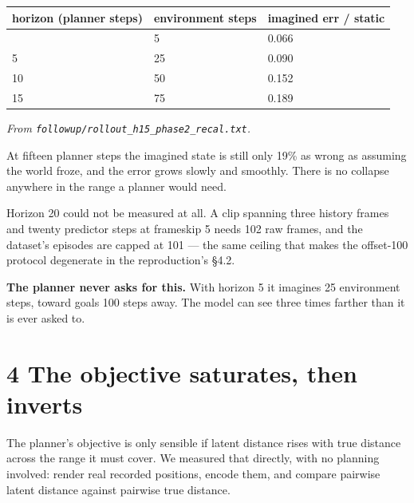 \documentclass[10pt]{article}
\newcounter{none}
\begin{document}
{\def\LTcaptype{none} %
\begin{longtable}[]{@{}lll@{}}
\toprule\noalign{}
horizon (planner steps) & environment steps & imagined err / static \\
\midrule\noalign{}
\endhead
\bottomrule\noalign{}
\endlastfoot
1 & 5 & 0.066 \\
5 & 25 & 0.090 \\
10 & 50 & 0.152 \\
15 & 75 & 0.189 \\
\end{longtable}
}

\emph{From \texttt{followup/rollout\_h15\_phase2\_recal.txt}.}

At fifteen planner steps the imagined state is still only 19\% as wrong as
assuming the world froze, and the error grows slowly and smoothly. There is no
collapse anywhere in the range a planner would need.

Horizon 20 could not be measured at all. A clip spanning three history frames
and twenty predictor steps at frameskip 5 needs 102 raw frames, and the
dataset's episodes are capped at 101 --- the same ceiling that makes the
offset-100 protocol degenerate in the reproduction's \S{}4.2.

\textbf{The planner never asks for this.} With horizon 5 it imagines 25
environment steps, toward goals 100 steps away. The model can see three times
farther than it is ever asked to.

\section{4 The objective saturates, then inverts}\label{the-objective-saturates-then-inverts}

The planner's objective is only sensible if latent distance rises with true
distance across the range it must cover. We measured that directly, with no
planning involved: render real recorded positions, encode them, and compare
pairwise latent distance against pairwise true distance.
\end{document}
